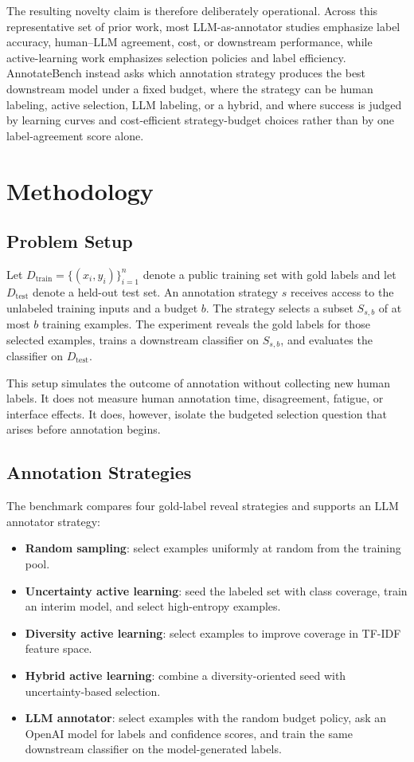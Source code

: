 \documentclass[11pt]{article}
\begin{document}
The resulting novelty claim is therefore deliberately operational. Across this representative set of prior work, most LLM-as-annotator studies emphasize label accuracy, human--LLM agreement, cost, or downstream performance, while active-learning work emphasizes selection policies and label efficiency. AnnotateBench instead asks which annotation strategy produces the best downstream model under a fixed budget, where the strategy can be human labeling, active selection, LLM labeling, or a hybrid, and where success is judged by learning curves and cost-efficient strategy-budget choices rather than by one label-agreement score alone.

\section{Methodology}

\subsection{Problem Setup}

Let $D_{\mathrm{train}}=\{(x_i,y_i)\}_{i=1}^{n}$ denote a public training set with gold labels and let $D_{\mathrm{test}}$ denote a held-out test set. An annotation strategy $s$ receives access to the unlabeled training inputs and a budget $b$. The strategy selects a subset $S_{s,b}$ of at most $b$ training examples. The experiment reveals the gold labels for those selected examples, trains a downstream classifier on $S_{s,b}$, and evaluates the classifier on $D_{\mathrm{test}}$.

This setup simulates the outcome of annotation without collecting new human labels. It does not measure human annotation time, disagreement, fatigue, or interface effects. It does, however, isolate the budgeted selection question that arises before annotation begins.

\subsection{Annotation Strategies}

The benchmark compares four gold-label reveal strategies and supports an LLM annotator strategy:

\begin{itemize}
  \item \textbf{Random sampling}: select examples uniformly at random from the training pool.
  \item \textbf{Uncertainty active learning}: seed the labeled set with class coverage, train an interim model, and select high-entropy examples.
  \item \textbf{Diversity active learning}: select examples to improve coverage in TF-IDF feature space.
  \item \textbf{Hybrid active learning}: combine a diversity-oriented seed with uncertainty-based selection.
  \item \textbf{LLM annotator}: select examples with the random budget policy, ask an OpenAI model for labels and confidence scores, and train the same downstream classifier on the model-generated labels.
\end{itemize}
\end{document}
